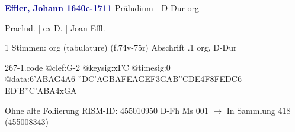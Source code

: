 \documentclass[twocolumn]{book}
\begin{document}
\newline \par \vspace{7pt} \textcolor{darkblue}{\textbf{Effler, Johann  1640c-1711}}
\newline Präludium - D-Dur
\newline org
\newline \begin{itshape}[f.75r, at left:] Praelud. | ex D. | Joan Effl.\end{itshape} 
\newline \textcolor{darkblue}{}  1 Stimmen: org (tabulature)  (f.74v-75r)
\newline Abschrift
.1  org, D-Dur  
\begin{filecontents*}{267-1.code}
@clef:G-2
@keysig:xFC
@timesig:0
@data:{6'ABAG}4A6-{''DC'A}{GBAF}{EAGE}{F3GA}{B''CDE}4F{8FEDC}6-{ED'B}{''C'ABA}4xGA
\end{filecontents*}
\newline
%
\newline Ohne alte Foliierung
\newline RISM-ID: 455010950
\newline D-Fh  Ms 001
\newline $\rightarrow$ In Sammlung 418 (455008343)
      
\end{document}
